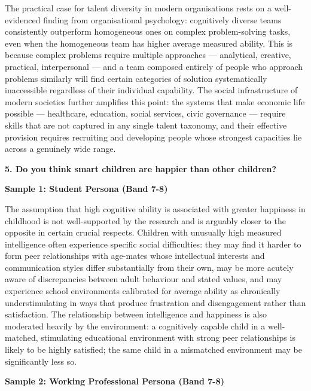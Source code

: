 The practical case for talent diversity in modern organisations rests on a well-evidenced finding from organisational psychology: cognitively diverse teams consistently outperform homogeneous ones on complex problem-solving tasks, even when the homogeneous team has higher average measured ability. This is because complex problems require multiple approaches — analytical, creative, practical, interpersonal — and a team composed entirely of people who approach problems similarly will find certain categories of solution systematically inaccessible regardless of their individual capability. The social infrastructure of modern societies further amplifies this point: the systems that make economic life possible — healthcare, education, social services, civic governance — require skills that are not captured in any single talent taxonomy, and their effective provision requires recruiting and developing people whose strongest capacities lie across a genuinely wide range.

\separator

\begin{ieltsquestion}
\textbf{5. Do you think smart children are happier than other children?}
\end{ieltsquestion}
\textbf{Sample 1: Student Persona (Band 7-8)}

The assumption that high cognitive ability is associated with greater happiness in childhood is not well-supported by the research and is arguably closer to the opposite in certain crucial respects. Children with unusually high measured intelligence often experience specific social difficulties: they may find it harder to form peer relationships with age-mates whose intellectual interests and communication styles differ substantially from their own, may be more acutely aware of discrepancies between adult behaviour and stated values, and may experience school environments calibrated for average ability as chronically understimulating in ways that produce frustration and disengagement rather than satisfaction. The relationship between intelligence and happiness is also moderated heavily by the environment: a cognitively capable child in a well-matched, stimulating educational environment with strong peer relationships is likely to be highly satisfied; the same child in a mismatched environment may be significantly less so.

\textbf{Sample 2: Working Professional Persona (Band 7-8)}

